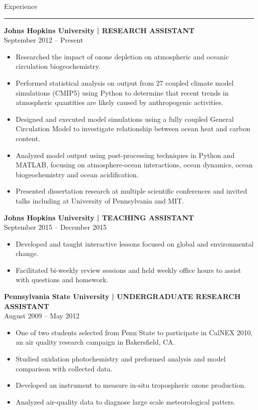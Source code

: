 \begin{cv}
{  }
  \clearpage
  \thispagestyle{myplain}
  \vspace{1cm}
  \noindent\Large{Experience}\\
  \vspace{0.2cm}
  \noindent\rule{\textwidth}{0.4pt}
  \normalsize{
  \textbf{Johns Hopkins University | RESEARCH ASSISTANT}\\
  September 2012 -- Present
  \begin{itemize}
   \item Researched the impact of ozone depletion on atmospheric and oceanic circulation biogeochemistry.
   \item Performed statistical analysis on output from 27 coupled climate model simulations (CMIP5) using Python to determine that recent trends in atmospheric quantities are likely caused by anthropogenic activities.
   \item Designed and executed model simulations using a fully coupled General Circulation Model to investigate relationship between ocean heat and carbon content.
   \item Analyzed model output using post-processing techniques in Python and MATLAB, focusing on atmosphere-ocean interactions, ocean dynamics, ocean biogeochemistry and ocean acidification.
   \item Presented dissertation research at multiple scientific conferences and invited talks including at University of Pennsylvania and MIT.
  \end{itemize}
  \textbf{Johns Hopkins University | TEACHING ASSISTANT}\\
  September 2015 -- December 2015
  \begin{itemize}
    \item Developed and taught interactive lessons focused on global and environmental change.
    \item Facilitated bi-weekly review sessions and held weekly office hours to assist with questions and homework.
  \end{itemize}
\textbf{Pennsylvania State University | UNDERGRADUATE RESEARCH ASSISTANT}\\
August 2009 -- May 2012
\begin{itemize}
  \item One of two students selected from Penn State to participate in CalNEX 2010, an air quality research campaign in Bakersfield, CA.
  \item Studied oxidation photochemistry and preformed analysis and model comparison with collected data.
  \item Developed an instrument to measure in-situ tropospheric ozone production.
  \item Analyzed air-quality data to diagnose large scale meteorological patters.
\end{itemize}


  }

\end{cv}
